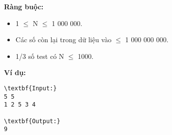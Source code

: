 \textbf{Ràng buộc: }
\begin{itemize}
	\item 1  $\le$  N  $\le$  1 000 000.
	\item Các số còn lại trong dữ liệu vào  $\le$  1 000 000 000.
	\item 1/3 số test có N  $\le$  1000.
\end{itemize}
\textbf{Ví dụ: }
\begin{verbatim}
\textbf{Input:}
5 5
1 2 5 3 4

\textbf{Output:}
9

\end{verbatim}
